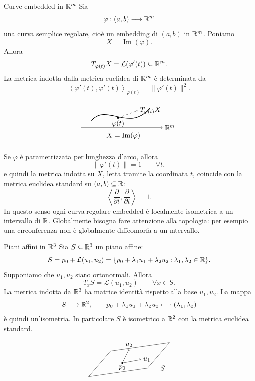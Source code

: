 \documentclass[a4paper]{article}
\begin{document}
\begin{snippetexample}{Curve embedded in \(\mathbb{R}^m\)}
Sia
\[
    \varphi:(a,b)\longrightarrow \mathbb{R}^m
\]
una curva semplice regolare, cioè un embedding di \((a,b)\) in \(\mathbb{R}^m\). Poniamo
\[
    X=\operatorname{Im}(\varphi).
\]
Allora
\[
    T_{\varphi(t)}X=\mathcal{L}(\varphi'(t))\subseteq \mathbb{R}^m.
\]
La metrica indotta dalla metrica euclidea di \(\mathbb{R}^m\) è determinata da
\[
    \left\langle \varphi'(t),\varphi'(t)\right\rangle_{\varphi(t)}
    =
    \|\varphi'(t)\|^2.
\]

\[
    \begin{tikzpicture}[scale=0.9]
        \draw[->] (-0.2,0) -- (4.4,0) node[right] {\(\realnumbers^m\)};
        \draw[thick] (0.4,0.4) .. controls (1.3,1.4) and (2.5,-0.3) .. (3.7,1.1);
        \draw[->, dashed] (1.9,0.55) -- (3.0,0.95) node[right] {\(T_{\varphi(t)}X\)};
        \fill (1.9,0.55) circle (1.5pt) node[below] {\(\varphi(t)\)};
        \node at (2.2,-0.45) {\(X=\operatorname{Im}(\varphi)\)};
    \end{tikzpicture}
\]

Se \(\varphi\) è parametrizzata per lunghezza d'arco, allora
\[
    \|\varphi'(t)\|=1
    \qquad
    \forall t,
\]
e quindi la metrica indotta su \(X\), letta tramite la coordinata \(t\), coincide con la metrica euclidea standard su \((a,b)\subseteq\mathbb{R}\):
\[
    \left\langle \frac{\partial}{\partial t},\frac{\partial}{\partial t}\right\rangle=1.
\]
In questo senso ogni curva regolare embedded è localmente isometrica a un intervallo di \(\mathbb{R}\). Globalmente bisogna fare attenzione alla topologia: per esempio una circonferenza non è globalmente diffeomorfa a un intervallo.
\end{snippetexample}

\begin{snippetexample}{Piani affini in \(\mathbb{R}^3\)}
Sia \(S\subseteq \mathbb{R}^3\) un piano affine:
\[
    S=p_0+\mathcal{L}(u_1,u_2)
    =
    \{p_0+\lambda_1u_1+\lambda_2u_2:\lambda_1,\lambda_2\in\mathbb{R}\}.
\]
Supponiamo che \(u_1,u_2\) siano ortonormali. Allora
\[
    T_xS=\mathcal{L}(u_1,u_2)
    \qquad
    \forall x\in S.
\]
La metrica indotta da \(\mathbb{R}^3\) ha matrice identità rispetto alla base \(u_1,u_2\). La mappa
\[
    S\longrightarrow \mathbb{R}^2,
    \qquad
    p_0+\lambda_1u_1+\lambda_2u_2
    \longmapsto
    (\lambda_1,\lambda_2)
\]
è quindi un'isometria. In particolare \(S\) è isometrico a \(\mathbb{R}^2\) con la metrica euclidea standard.

\[
    \begin{tikzpicture}[scale=0.85]
        \draw (0,0) -- (3.5,0.5) -- (4.8,2) -- (1.3,1.5) -- cycle;
        \fill (2,0.8) circle (1.5pt) node[below] {\(p_0\)};
        \draw[->] (2,0.8) -- (3.1,1.0) node[right] {\(u_1\)};
        \draw[->] (2,0.8) -- (2.4,1.6) node[above] {\(u_2\)};
        \node at (4.4,0.5) {\(S\)};
    \end{tikzpicture}
\]
\end{snippetexample}
\end{document}
